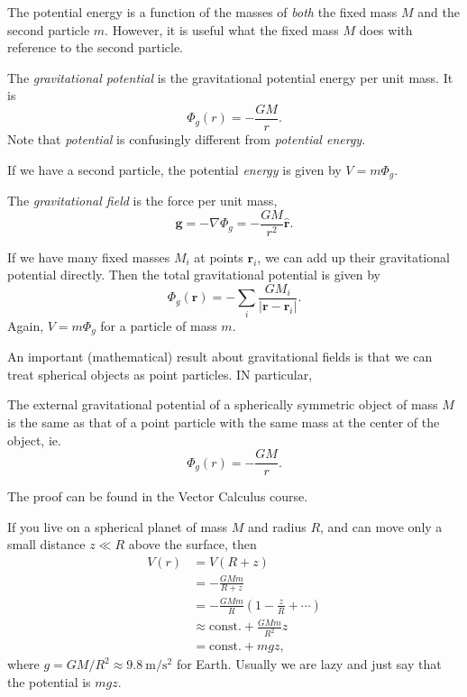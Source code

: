 \documentclass[a4paper]{article}
\begin{document}
The potential energy is a function of the masses of \emph{both} the fixed mass $M$ and the second particle $m$. However, it is useful what the fixed mass $M$ does with reference to the second particle.
\begin{defi}
  The \emph{gravitational potential} is the gravitational potential energy per unit mass. It is
  \[
    \Phi_g(r) = -\frac{GM}{r}.
  \]
  Note that \emph{potential} is confusingly different from \emph{potential energy}.

  If we have a second particle, the potential \emph{energy} is given by $V = m\Phi_g$.

  The \emph{gravitational field} is the force per unit mass,
  \[
    \mathbf{g} = -\nabla \Phi_g = -\frac{GM}{r^2}\hat{\mathbf{r}}.
  \]
\end{defi}

If we have many fixed masses $M_i$ at points $\mathbf{r}_i$, we can add up their gravitational potential directly. Then the total gravitational potential is given by
\[
  \Phi_g(\mathbf{r}) = -\sum_i \frac{GM_i}{|\mathbf{r} - \mathbf{r}_i|}.
\]
Again, $V = m\Phi_g$ for a particle of mass $m$.

An important (mathematical) result about gravitational fields is that we can treat spherical objects as point particles. IN particular,
\begin{prop}
  The external gravitational potential of a spherically symmetric object of mass $M$ is the same as that of a point particle with the same mass at the center of the object, ie.
  \[
    \Phi_g(r) = -\frac{GM}{r}.
  \]
\end{prop}
The proof can be found in the Vector Calculus course.

\begin{eg}
  If you live on a spherical planet of mass $M$ and radius $R$, and can move only a small distance $z \ll R$ above the surface, then
  \begin{align*}
    V(r) &= V(R + z)\\
    &= -\frac{GMm}{R + z}\\
    &= -\frac{GMm}{R}\left(1 - \frac{z}{R} + \cdots\right)\\
    &\approx \text{const.} + \frac{GMm}{R^2}z\\
    &= \text{const.} + mgz,
  \end{align*}
  where $g = GM/R^2 \approx \SI{9.8}{\meter\per\second\squared}$ for Earth. Usually we are lazy and just say that the potential is $mgz$.
\end{eg}
\end{document}
